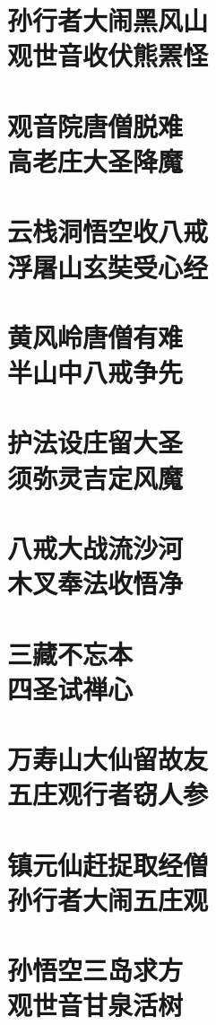 \documentclass[a4paper,12pt,UTF8,twoside]{ctexbook}
\begin{document}
\chapter[孙行者大闹黑风山\ 观世音收伏熊罴怪]{孙行者大闹黑风山\\观世音收伏熊罴怪}
\chapter[观音院唐僧脱难\ 高老庄大圣降魔]{观音院唐僧脱难\\高老庄大圣降魔}
\chapter[云栈洞悟空收八戒\ 浮屠山玄奘受心经]{云栈洞悟空收八戒\\浮屠山玄奘受心经}
\chapter[黄风岭唐僧有难\ 半山中八戒争先]{黄风岭唐僧有难\\半山中八戒争先}
\chapter[护法设庄留大圣\ 须弥灵吉定风魔]{护法设庄留大圣\\须弥灵吉定风魔}
\chapter[八戒大战流沙河\ 木叉奉法收悟净]{八戒大战流沙河\\木叉奉法收悟净}
\chapter[三藏不忘本\ 四圣试禅心]{三藏不忘本\\四圣试禅心}
\chapter[万寿山大仙留故友\ 五庄观行者窃人参]{万寿山大仙留故友\\五庄观行者窃人参}
\chapter[镇元仙赶捉取经僧\ 孙行者大闹五庄观]{镇元仙赶捉取经僧\\孙行者大闹五庄观}
\chapter[孙悟空三岛求方\ 观世音甘泉活树]{孙悟空三岛求方\\观世音甘泉活树}
\end{document}
